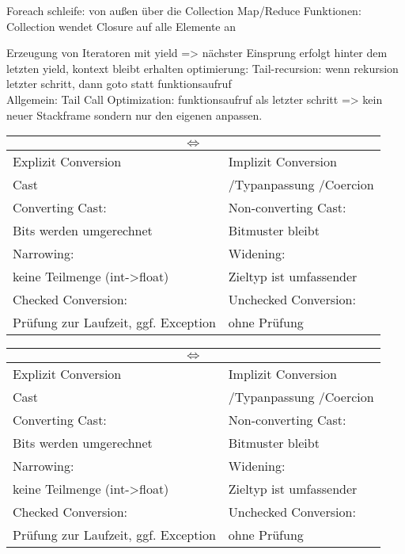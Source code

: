 
Foreach schleife: von außen über die Collection
Map/Reduce Funktionen: Collection wendet Closure auf alle Elemente an

Erzeugung von Iteratoren mit yield => nächster Einsprung erfolgt hinter dem letzten yield, kontext bleibt erhalten
optimierung: Tail-recursion: wenn rekursion letzter schritt, dann goto statt funktionsaufruf\\
Allgemein: Tail Call Optimization: funktionsaufruf als letzter schritt => kein neuer Stackframe sondern nur den eigenen anpassen.




\begin{tabular}{|l|l|}
\hline
\multicolumn{2}{|c|}{$\Leftrightarrow$}\\
\hline
Explizit Conversion  & Implizit Conversion \\
Cast &/Typanpassung /Coercion  \\
\hline
Converting Cast:  & Non-converting Cast: \\
Bits werden umgerechnet & Bitmuster bleibt \\
\hline
Narrowing:  & Widening:  \\
keine Teilmenge (int->float)&Zieltyp ist umfassender\\
\hline
Checked Conversion:   &Unchecked Conversion:  \\
Prüfung zur Laufzeit, ggf. Exception &ohne Prüfung\\
\hline
\end{tabular}



\begin{tabular}{|l|l|}
\hline
\multicolumn{2}{|c|}{$\Leftrightarrow$}\\
\hline
Explizit Conversion  & Implizit Conversion \\
Cast &/Typanpassung /Coercion  \\
\hline
Converting Cast:  & Non-converting Cast: \\
Bits werden umgerechnet & Bitmuster bleibt \\
\hline
Narrowing:  & Widening:  \\
keine Teilmenge (int->float)&Zieltyp ist umfassender\\
\hline
Checked Conversion:   &Unchecked Conversion:  \\
Prüfung zur Laufzeit, ggf. Exception &ohne Prüfung\\
\hline
\end{tabular}

